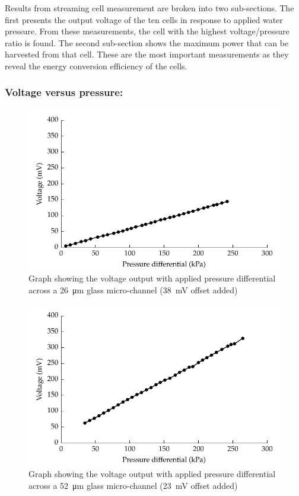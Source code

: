 Results from streaming cell measurement are broken into two sub-sections.
The first presents the output voltage of the ten cells in response to applied water pressure.
From these measurements, the cell with the highest voltage/pressure ratio is found.
The second sub-section shows the maximum power that can be harvested from that cell.
These are the most important measurements as they reveal the energy conversion efficiency of the cells.

\subsubsection*{Voltage versus pressure:}


\begin{figure}[p]
    \centering
    \includegraphics{content/pt1/01-PowerHarvesting/graphics/streamingCell_voltVsPress_26um_out}
    \caption{\label{fig:VvsP_26um}Graph showing the voltage output with applied pressure differential across a \SI{26}{\micro\metre} glass micro-channel (\SI{38}{\milli\volt} offset added)}
\end{figure}

\begin{figure}
    \centering
    \includegraphics{content/pt1/01-PowerHarvesting/graphics/streamingCell_voltVsPress_52um_out}
    \caption{\label{fig:VvsP_52um}Graph showing the voltage output with applied pressure differential across a \SI{52}{\micro\metre} glass micro-channel (\SI{23}{\milli\volt} offset added)}
\end{figure}

